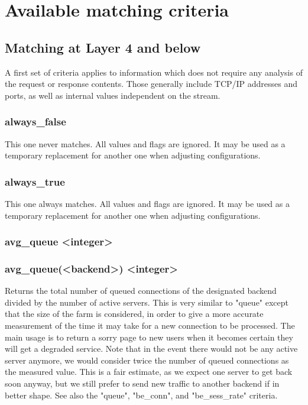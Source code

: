 \section{Available matching criteria}

\subsection{Matching at Layer 4 and below}

A first set of criteria applies to information which does not require any
analysis of the request or response contents. Those generally include TCP/IP
addresses and ports, as well as internal values independent on the stream.

\subsubsection[always\_false]{always\_false}
  This one never matches. All values and flags are ignored. It may be used as
  a temporary replacement for another one when adjusting configurations.

\subsubsection[always\_true]{always\_true}
  This one always matches. All values and flags are ignored. It may be used as
  a temporary replacement for another one when adjusting configurations.

\subsubsection[avg\_queue]{avg\_queue <integer>}
\subsubsection*{avg\_queue(<backend>) <integer>}
  Returns the total number of queued connections of the designated backend
  divided by the number of active servers. This is very similar to "queue"
  except that the size of the farm is considered, in order to give a more
  accurate measurement of the time it may take for a new connection to be
  processed. The main usage is to return a sorry page to new users when it
  becomes certain they will get a degraded service. Note that in the event
  there would not be any active server anymore, we would consider twice the
  number of queued connections as the measured value. This is a fair estimate,
  as we expect one server to get back soon anyway, but we still prefer to send
  new traffic to another backend if in better shape. See also the "queue",
  "be\_conn", and "be\_sess\_rate" criteria.

